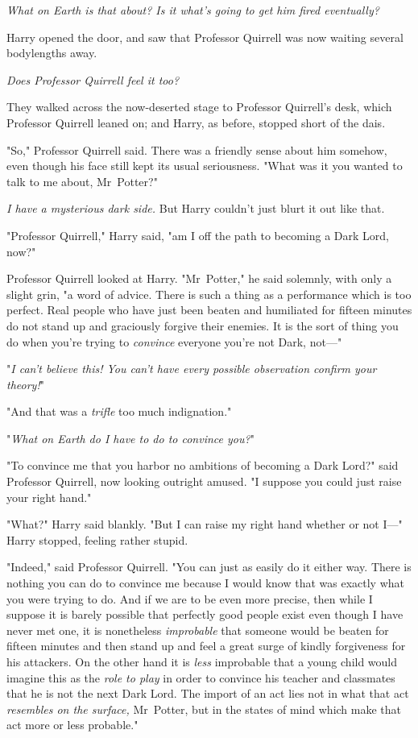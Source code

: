 \emph{What on Earth is that about? Is it what's going to get him fired
eventually?}

Harry opened the door, and saw that Professor Quirrell was now waiting several
bodylengths away.

\emph{Does Professor Quirrell feel it too?}

They walked across the now-deserted stage to Professor Quirrell's desk, which
Professor Quirrell leaned on; and Harry, as before, stopped short of the dais.

"So," Professor Quirrell said. There was a friendly sense about him somehow,
even though his face still kept its usual seriousness. "What was it you wanted
to talk to me about, Mr~Potter?"

\emph{I have a mysterious dark side.} But Harry couldn't just blurt it out like
that.

"Professor Quirrell," Harry said, "am I off the path to becoming a Dark Lord,
now?"

Professor Quirrell looked at Harry. "Mr~Potter," he said solemnly, with only a
slight grin, "a word of advice. There is such a thing as a performance which is
too perfect. Real people who have just been beaten and humiliated for fifteen
minutes do not stand up and graciously forgive their enemies. It is the sort of
thing you do when you're trying to \emph{convince} everyone you're not Dark,
not—"

"\emph{I can't believe this! You can't have every possible observation confirm
your theory!}"

"And that was a \emph{trifle} too much indignation."

"\emph{What on Earth do I have to do to convince you?}"

"To convince me that you harbor no ambitions of becoming a Dark Lord?" said
Professor Quirrell, now looking outright amused. "I suppose you could just
raise your right hand."

"What?" Harry said blankly. "But I can raise my right hand whether or not I—"
Harry stopped, feeling rather stupid.

"Indeed," said Professor Quirrell. "You can just as easily do it either way.
There is nothing you can do to convince me because I would know that was
exactly what you were trying to do. And if we are to be even more precise, then
while I suppose it is barely possible that perfectly good people exist even
though I have never met one, it is nonetheless \emph{improbable} that someone
would be beaten for fifteen minutes and then stand up and feel a great surge of
kindly forgiveness for his attackers. On the other hand it is \emph{less}
improbable that a young child would imagine this as the \emph{role to play} in
order to convince his teacher and classmates that he is not the next Dark Lord.
The import of an act lies not in what that act \emph{resembles on the surface,}
Mr~Potter, but in the states of mind which make that act more or less
probable."

